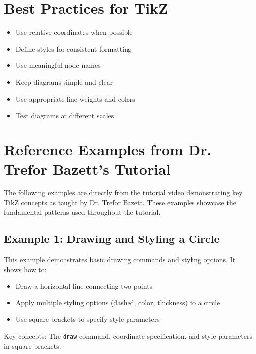 \documentclass{article}
\begin{document}
\section{Best Practices for TikZ}
\begin{itemize}
    \item Use relative coordinates when possible
    \item Define styles for consistent formatting
    \item Use meaningful node names
    \item Keep diagrams simple and clear
    \item Use appropriate line weights and colors
    \item Test diagrams at different scales
\end{itemize}

\section{Reference Examples from Dr. Trefor Bazett's Tutorial}
The following examples are directly from the tutorial video demonstrating key TikZ concepts as taught by Dr. Trefor Bazett. These examples showcase the fundamental patterns used throughout the tutorial.

\subsection{Example 1: Drawing and Styling a Circle}
This example demonstrates basic drawing commands and styling options. It shows how to:
\begin{itemize}
    \item Draw a horizontal line connecting two points
    \item Apply multiple styling options (dashed, color, thickness) to a circle
    \item Use square brackets to specify style parameters
\end{itemize}

\begin{center}
\end{center}

Key concepts: The \texttt{draw} command, coordinate specification, and style parameters in square brackets.
\end{document}
